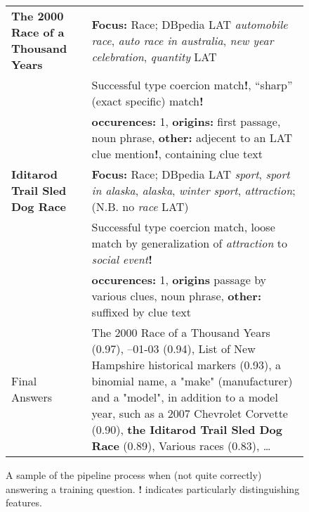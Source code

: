 \begin{figure}[t!]
\begin{tabular}{|p{1.8cm}p{6cm}|}
\textbf{The 2000 Race of a Thousand Years} %
	& \textbf{Focus:} Race; DBpedia LAT \textit{automobile race}, \textit{auto race in australia}, \textit{new year celebration}, \textit{quantity} LAT \\
	& Successful type coercion match\textbf{!}, ``sharp'' (exact specific) match\textbf{!} \\
	& \textbf{occurences:} 1, \textbf{origins:}  first passage, noun phrase, \textbf{other:} adjecent to an LAT clue mention\textbf{!}, containing clue text \\
\textbf{Iditarod Trail Sled Dog Race} %
	& \textbf{Focus:} Race; DBpedia LAT \textit{sport}, \textit{sport in alaska}, \textit{alaska}, \textit{winter sport}, \textit{attraction}; (N.B. no \textit{race} LAT) \\
	& Successful type coercion match, loose match by generalization of \textit{attraction} to \textit{social event}\textbf{!} \\
	& \textbf{occurences:} 1, \textbf{origins}   passage by various clues, noun phrase,
	\textbf{other:} suffixed by clue text \\ \hline

Final Answers & The 2000 Race of a Thousand Years (0.97), --01-03 (0.94), List of New Hampshire historical markers (0.93), a binomial name, a "make" (manufacturer) and a "model", in addition to a model year, such as a 2007 Chevrolet Corvette (0.90), \textbf{the Iditarod Trail Sled Dog Race} (0.89), Various races (0.83), \dots \\ \hline
\end{tabular}
\vspace*{-0.2cm}
\caption{A sample of the pipeline process when (not quite correctly) answering a training question. \textbf{!} indicates particularly distinguishing features.}
\label{fig:exIditarod}
\end{figure}
